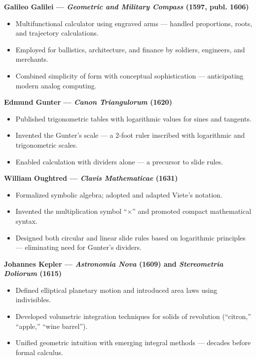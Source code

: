 \documentclass[9pt]{article}
\begin{document}
\textbf{Galileo Galilei — \textit{Geometric and Military Compass} (1597, publ. 1606)}

\begin{itemize}
    \item Multifunctional calculator using engraved arms — handled proportions, roots, and trajectory calculations.
    \item Employed for ballistics, architecture, and finance by soldiers, engineers, and merchants.
    \item Combined simplicity of form with conceptual sophistication — anticipating modern analog computing.
\end{itemize}

\textbf{Edmund Gunter — \textit{Canon Triangulorum} (1620)}

\begin{itemize}
    \item Published trigonometric tables with logarithmic values for sines and tangents.
    \item Invented the Gunter’s scale — a 2-foot ruler inscribed with logarithmic and trigonometric scales.
    \item Enabled calculation with dividers alone — a precursor to slide rules.
\end{itemize}

\textbf{William Oughtred — \textit{Clavis Mathematicae} (1631)}

\begin{itemize}
    \item Formalized symbolic algebra; adopted and adapted Viete’s notation.
    \item Invented the multiplication symbol ``$\times$'' and promoted compact mathematical syntax.
    \item Designed both circular and linear slide rules based on logarithmic principles — eliminating need for Gunter’s dividers.
\end{itemize}

\textbf{Johannes Kepler — \textit{Astronomia Nova} (1609) and \textit{Stereometria Doliorum} (1615)}

\begin{itemize}
    \item Defined elliptical planetary motion and introduced area laws using indivisibles.
    \item Developed volumetric integration techniques for solids of revolution (``citron,'' ``apple,'' ``wine barrel'').
    \item Unified geometric intuition with emerging integral methods — decades before formal calculus.
\end{itemize}
\end{document}
